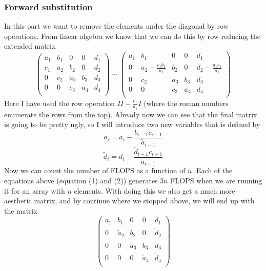 \documentclass{scrartcl}
\begin{document}
\subsubsection{Forward substitution}
In this part we want to remove the elements under the diagonal by row operations. 
From linear algebra we know that we can do this by row reducing the extended matrix
\[
 \left(
  \begin{array}{cccc|c}
   a_1 & b_1 & 0 & 0 & d_1 \\
   c_1 & a_2 & b_2 & 0 & d_2 \\
   0 & c_2 & a_3 & b_3 & d_3 \\
   0 & 0 & c_3 & a_4 & d_4 \\
  \end{array}
 \right)\sim
 \left(
  \begin{array}{cccc|c}
   a_1 & b_1 & 0 & 0 & d_1 \\
   0 & a_2-\frac{c_1b_1}{a_1} & b_2 & 0 & d_2-\frac{d_1c_1}{a_1} \\
   0 & c_2 & a_3 & b_3 & d_3 \\
   0 & 0 & c_3 & a_4 & d_4 \\
  \end{array}
 \right)
\]
Here I have used the row operation $II-\frac{c_1}{a_1}I$ (where the roman numbers enumerate the rows from the top). Already now we can see that the final matrix is going to be pretty ugly, so I will introduce two new variables that is defined by
\begin{equation}
\tilde{a}_i=a_i-\frac{b_{i-1}c_{i-1}}{\tilde{a}_{i-1}}
\end{equation}
\begin{equation}
\tilde{d}_i=d_i-\frac{\tilde{d}_{i-1} c_{i-1}}{ \tilde{a}_{i-1}}
\end{equation}
Now we can count the number of FLOPS as a function of $n$. Each of the equations above (equation (1) and (2)) generates $3n$ FLOPS when we are running it for an array with $n$ elements.  With doing this we also get a much more aesthetic matrix, and by continue where we stopped above, we will end up with the matrix
\[
 \left(
  \begin{array}{cccc|c}
   a_1 & b_1 & 0 & 0 & d_1 \\
   0 & \tilde{a}_2 & b_2 & 0 & \tilde{d}_2 \\
   0 & 0 & \tilde{a}_3 & b_3 & \tilde{d}_3 \\
   0 & 0 & 0 & \tilde{a}_4 & \tilde{d}_4 \\
  \end{array}
 \right)
\]
\end{document}
